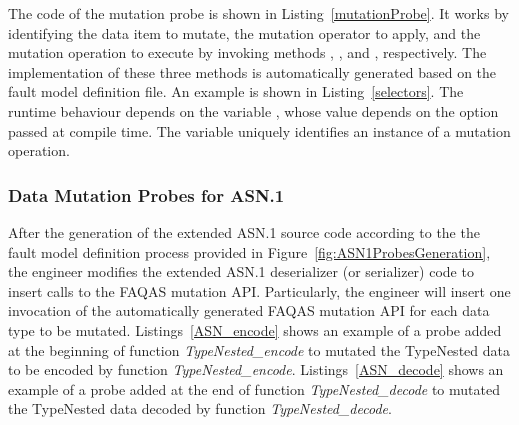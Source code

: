The code of the mutation probe is shown in Listing~\ref{mutationProbe}. It works by identifying the data item to mutate, the mutation operator to apply, and the mutation operation to execute by invoking methods ,
, and , respectively. The implementation of these three methods is automatically generated based on the fault model definition file.
An example is shown in Listing~\ref{selectors}. The runtime behaviour depends on the variable , whose value depends on the option passed at compile time. 
The variable  uniquely identifies an instance of a mutation operation.












\subsubsection{Data Mutation Probes for ASN.1}
\label{sec:FAQASDataMutationProbesASN}




 
After the generation of the extended ASN.1 source code according to the 
the fault model definition process provided in Figure~\ref{fig:ASN1ProbesGeneration}, the engineer modifies the extended ASN.1 deserializer (or serializer) code to insert calls to the FAQAS mutation API. 
Particularly, the engineer will insert one 
invocation of the automatically generated FAQAS mutation API for each data type to be mutated.
Listings~\ref{ASN_encode} shows an example of a probe added at the beginning of function \emph{TypeNested\_encode} to mutated the TypeNested data to be encoded by function \emph{TypeNested\_encode}.
Listings~\ref{ASN_decode} shows an example of a probe added 
at the end of function \emph{TypeNested\_decode}
to mutated the TypeNested data decoded by function \emph{TypeNested\_decode}.

